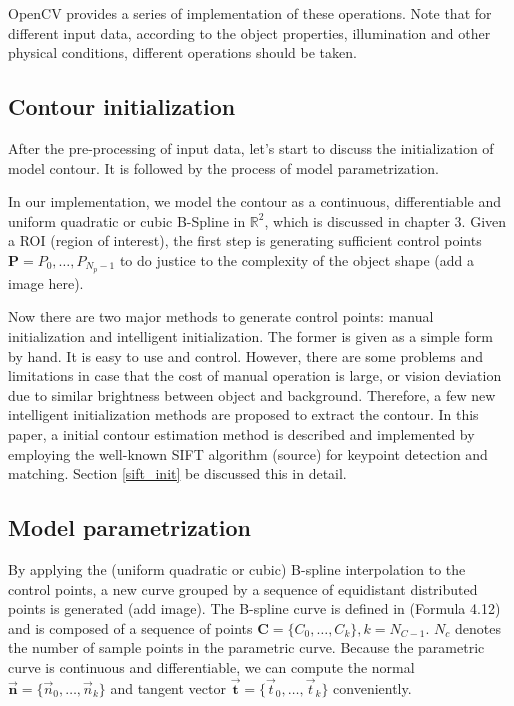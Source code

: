 OpenCV provides a series of implementation of these operations. Note
that for different input data, according to the object properties,
illumination and other physical conditions, different operations
should be taken. 

\subsection{Contour initialization}
\label{sec:mp}

After the pre-processing of input data, let's start to discuss the
initialization of model contour. It is followed by the process of
model parametrization.

In our implementation, we model the
contour as a continuous, differentiable and uniform quadratic or cubic
B-Spline in $\mathbb{R}^2$, which is discussed in chapter 3. 
Given a ROI (region of interest), the first step is generating
sufficient control points $\mathbf{P} = {P_0, \ldots, P_{N_p-1}}$ to
do justice to the complexity of the object shape (add a image here).

Now there are two major methods to generate control points:
manual initialization and intelligent initialization. The former is
given as a simple form by hand. It is easy to use and
control. However, there are some problems and limitations in case that
the cost of manual operation is large, or vision deviation due to
similar brightness between object and background. Therefore, a few new
intelligent initialization methods are proposed to extract the
contour.
In this paper, a initial contour estimation method is described and
implemented by employing the well-known SIFT algorithm (source) for
keypoint detection and matching. Section \ref{sift_init} be discussed this in
detail.

\subsection{Model parametrization}
\label{sec:mp}

By applying the (uniform quadratic or cubic) B-spline interpolation to the control points, a new curve
grouped by a sequence of equidistant distributed points is generated
(add image). The B-spline curve is defined in (Formula 4.12) and is
composed of a sequence of points $\mathbf{C} = \{C_0, \ldots,
C_{k}\}, k = N_{C-1}$. $N_c$ denotes the number of sample points in the
parametric curve. Because the parametric curve is continuous and
differentiable, we can compute the normal $\vec{\mathbf{n}} = \{\vec{n}_0, \ldots,
\vec{n}_{k}\}$ and tangent vector $\vec{\mathbf{t}} = \{\vec{t}_0, \ldots, \vec{t}_{k}\}$
conveniently. 

